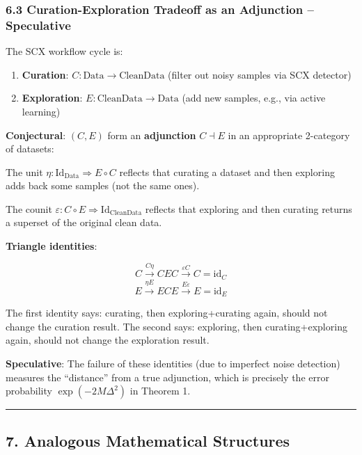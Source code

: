 \documentclass[
  12pt,
]{ctexart}
\providecommand{\tightlist}{%
  \setlength{\itemsep}{0pt}\setlength{\parskip}{0pt}}
\begin{document}
\subsubsection{6.3 Curation-Exploration Tradeoff as an Adjunction --
Speculative}\label{curation-exploration-tradeoff-as-an-adjunction-speculative}

The SCX workflow cycle is:

\begin{enumerate}
\def\labelenumi{\arabic{enumi}.}
\tightlist
\item
  \textbf{Curation}: \(C: \text{Data} \to \text{CleanData}\) (filter out
  noisy samples via SCX detector)
\item
  \textbf{Exploration}: \(E: \text{CleanData} \to \text{Data}\) (add new
  samples, e.g., via active learning)
\end{enumerate}

\textbf{Conjectural}: \((C, E)\) form an \textbf{adjunction}
\(C \dashv E\) in an appropriate 2-category of datasets:

The unit \(\eta: \text{Id}_{\text{Data}} \Rightarrow E \circ C\)
reflects that curating a dataset and then exploring adds back some
samples (not the same ones).

The counit
\(\varepsilon: C \circ E \Rightarrow \text{Id}_{\text{CleanData}}\)
reflects that exploring and then curating returns a superset of the
original clean data.

\textbf{Triangle identities}:

\[C \xrightarrow{C\eta} CEC \xrightarrow{\varepsilon C} C = \text{id}_C\]
\[E \xrightarrow{\eta E} ECE \xrightarrow{E\varepsilon} E = \text{id}_E\]

The first identity says: curating, then exploring+curating again, should
not change the curation result. The second says: exploring, then
curating+exploring again, should not change the exploration result.

\textbf{Speculative}: The failure of these identities (due to imperfect
noise detection) measures the ``distance'' from a true adjunction, which
is precisely the error probability \(\exp(-2M\Delta^2)\) in Theorem 1.

\begin{center}\rule{0.5\linewidth}{0.5pt}\end{center}

\subsection{7. Analogous Mathematical
Structures}\label{analogous-mathematical-structures}
\end{document}
